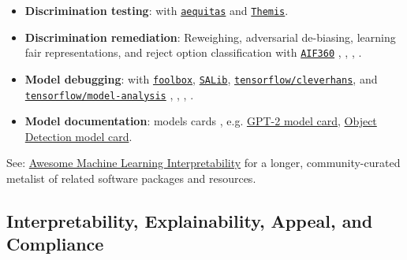 \documentclass[information,article,submit,moreauthors,pdftex]{definitions/mdpi}
\begin{document}
{\begin{itemize}[leftmargin=*,labelsep=5.8mm]
\item \textbf{Discrimination testing}: with \href{https://github.com/dssg/aequitas}{\texttt{aequitas}} and \href{https://github.com/LASER-UMASS/Themis}{\texttt{Themis}}.

\item \textbf{Discrimination remediation}: Reweighing, adversarial de-biasing, learning fair representations, and reject option classification with \href{http://aif360.mybluemix.net/}{\texttt{AIF360}} \cite{kamiran2012data}, \cite{zhang2018mitigating}, \cite{lfr}, \cite{kamiran2012decision}.

\item \textbf{Model debugging}: with \href{https://github.com/bethgelab/foolbox}{\texttt{foolbox}}, \href{https://github.com/SALib/SALib}{\texttt{SALib}}, \href{https://github.com/tensorflow/cleverhans}{\texttt{tensorflow/cleverhans}}, and \href{https://github.com/tensorflow/model-analysis}{\texttt{tensorflow/model-analysis}} \cite{rauber2017foolbox}, \cite{papernot2018cleverhans}, \cite{modeltracker}, \cite{papernot2018marauder}.

\item \textbf{Model documentation}: models cards \cite{model_cards}, e.g.  \href{https://github.com/openai/gpt-2/blob/master/model_card.md}{GPT-2 model card}, \href{https://modelcards.withgoogle.com/object-detection}{Object Detection model card}. 

\end{itemize}

\noindent See: \href{https://github.com/jphall663/awesome-machine-learning-interpretability}{Awesome Machine Learning Interpretability} for a longer, community-curated metalist of related software packages and resources. 

\subsection{Interpretability, Explainability, Appeal, and Compliance}

}
\end{document}
